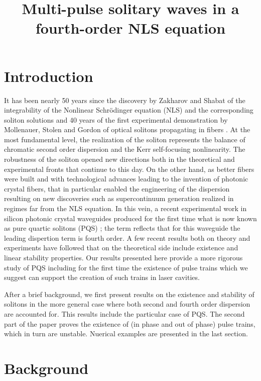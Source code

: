 \documentclass[12pt]{article}
\title{Multi-pulse solitary waves in a fourth-order NLS equation}
\begin{document}
\maketitle

\section{Introduction}
It has been nearly 50 years since the discovery by Zakharov and Shabat \cite{Zak72} of the integrability of the Nonlinear Schr\"odinger equation (NLS) and the corresponding soliton solutions and 40 years of the first experimental demonstration by Mollenauer, Stolen and Gordon of optical solitons propagating in fibers \cite{Moll80}. At the most fundamental level, the realization of the soliton represents the balance of chromatic second order dispersion and the Kerr self-focusing nonlinearity. The robustness of the soliton opened new directions both in the theoretical and experimental fronts that continue to this day. On the other hand, as better fibers were built and with technological advances leading to the invention of photonic crystal fibers, that in particular enabled the engineering of the dispersion resulting on new discoveries such as supercontinuum generation realized in regimes far from the NLS equation.   
In this vein, a recent experimental work in silicon photonic
crystal waveguides produced for the first time what is now known as pure quartic solitons (PQS) \cite{BlancoPQS}; the term reflects that for this waveguide the leading dispertion term is fourth order. A few recent results both on theory and experiments have followed \cite{Tam2019, Tam2020} that on the theoretical side include existence and linear stability properties. Our results presented here provide a more rigorous study of PQS including for the first time the existence of pulse trains which we suggest can support the creation of such trains in laser cavities.

\noindent
After a brief background, we first present results on the existence and stability of solitons in the more general case where both second and fourth order dispersion are accounted for. This results include the particular case of PQS. The second part of the paper proves the existence of (in phase and out of phase) pulse trains, which in turn are unstable. Nuerical examples are presented in the last section.


\section{Background}
\end{document}
